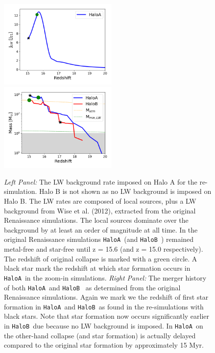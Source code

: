 \documentclass[graphics, twocolumn, usenatbib]{mn2e}
\newcommand{\ha} {\texttt{HaloA~}}
\newcommand{\hb} {\texttt{HaloB~}}
\begin{document}
\begin{figure}
\centering
\begin{minipage}{175mm}      \begin{center} 
\centerline{
\includegraphics[width=0.52\textwidth]{FIGURES/Combined.png}
\includegraphics[width=0.52\textwidth]{FIGURES/MassHistory.png}}
\caption{\textit{Left Panel:} The LW background rate imposed on Halo A for the re-simulation. Halo B is not shown
  as no LW background is imposed on Halo B. The LW rates
  are composed of local sources, plus a LW background from Wise et al. (2012), extracted from the original
  Renaissance simulations. The local sources dominate over the background by at least an order of magnitude at
  all time. In the original
  Renaissance simulations \ha (and \hb) remained metal-free and star-free until z = 15.6 (and
  z = 15.0 respectively). The redshift of original collapse is marked with a green circle.
  A black star mark the redshift at which star formation occurs in \ha in the zoom-in simulations.
  \textit{Right Panel:} The merger history of both \ha and \hb
  as determined from the original Renaissance simulations. Again we mark we the redshift of first star formation
  in \ha and \hb as found in the re-simulations with black stars. Note that star formation now occurs significantly
  earlier in \hb due because no LW background is imposed. In \ha on the other-hand collapse (and star formation) is
  actually delayed compared to the original star formation by approximately 15 Myr. 
  }  \label{Fig:LWHistory}
\end{center} \end{minipage}

\end{figure}
\end{document}
